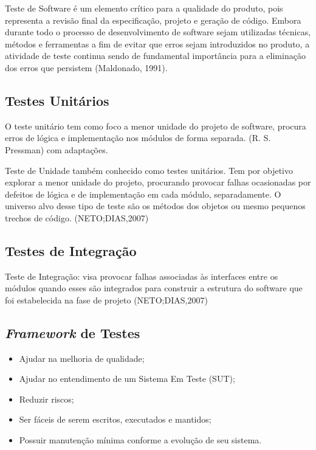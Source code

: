 Teste de Software é um elemento crítico para a qualidade do produto, pois representa a revisão final da especificação, projeto e geração de código. Embora durante todo o processo de desenvolvimento de software sejam utilizadas técnicas, métodos e ferramentas a fim de evitar que erros sejam introduzidos no produto, a atividade de teste continua sendo de fundamental importância para a eliminação dos erros que persistem (Maldonado, 1991).

    \subsection{Testes Unitários}
        O teste unitário tem como foco a menor unidade do projeto de software, procura erros de lógica e implementação nos módulos de forma separada. (R. S. Pressman) com adaptações.

         Teste de Unidade também conhecido como testes unitários. Tem por objetivo explorar a menor unidade do projeto, procurando provocar falhas ocasionadas por defeitos de lógica e de implementação em cada módulo, separadamente. O universo alvo desse tipo de teste são os métodos dos objetos ou mesmo pequenos trechos de código. (NETO;DIAS,2007)
        
        

    \subsection{Testes de Integração}

        Teste de Integração: visa provocar falhas associadas às interfaces entre os módulos quando esses são integrados para construir a estrutura do software que foi estabelecida na fase de projeto 
        (NETO;DIAS,2007)


    \subsection{\textit{Framework} de Testes}
        

        \begin{itemize}

        \item Ajudar na melhoria de qualidade;
        \item Ajudar no entendimento de um Sistema Em Teste (SUT);
        \item Reduzir riscos;
        \item Ser fáceis de serem escritos, executados e mantidos;
        \item Possuir manutenção mínima conforme a evolução de seu sistema.

        \end{itemize}

